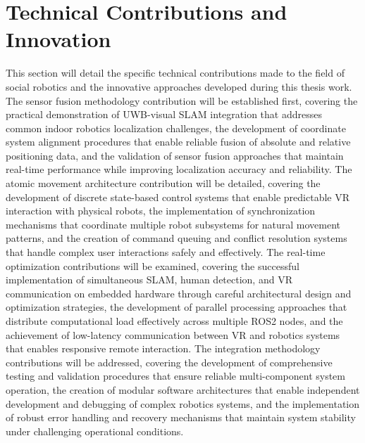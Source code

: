 \section{Technical Contributions and Innovation}
This section will detail the specific technical contributions made to the field of social robotics and the innovative approaches developed during this thesis work. The sensor fusion methodology contribution will be established first, covering the practical demonstration of UWB-visual SLAM integration that addresses common indoor robotics localization challenges, the development of coordinate system alignment procedures that enable reliable fusion of absolute and relative positioning data, and the validation of sensor fusion approaches that maintain real-time performance while improving localization accuracy and reliability. The atomic movement architecture contribution will be detailed, covering the development of discrete state-based control systems that enable predictable VR interaction with physical robots, the implementation of synchronization mechanisms that coordinate multiple robot subsystems for natural movement patterns, and the creation of command queuing and conflict resolution systems that handle complex user interactions safely and effectively. The real-time optimization contributions will be examined, covering the successful implementation of simultaneous SLAM, human detection, and VR communication on embedded hardware through careful architectural design and optimization strategies, the development of parallel processing approaches that distribute computational load effectively across multiple ROS2 nodes, and the achievement of low-latency communication between VR and robotics systems that enables responsive remote interaction. The integration methodology contributions will be addressed, covering the development of comprehensive testing and validation procedures that ensure reliable multi-component system operation, the creation of modular software architectures that enable independent development and debugging of complex robotics systems, and the implementation of robust error handling and recovery mechanisms that maintain system stability under challenging operational conditions.

